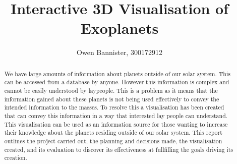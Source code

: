 \documentclass[11pt
              , a4paper
              , twoside
              , openright
              ]{report}
\title{Interactive 3D Visualisation of Exoplanets}
\author{Owen Bannister, 300172912}
\date{}
\begin{document}
\frontmatter



\begin{abstract}


We have large amounts of information about planets outside of our solar system. This can be accessed from a database by anyone. However this information is complex and cannot be easily understood by laypeople. This is a problem as it means that the information gained about these planets is not being used effectively to convey the intended information to the masses. To resolve this a visualisation has been created that can convey this information in a way that interested lay people can understand. This visualisation can be used as an information source for those wanting to increase their knowledge about the planets residing outside of our solar system. This report outlines the project carried out, the planning and decisions made, the visualisation created, and its evaluation to discover its effectiveness at fullfilling the goals driving its creation.


\end{abstract}


\maketitle



\tableofcontents



\mainmatter












\backmatter



%
\nocite{*}


\end{document}
